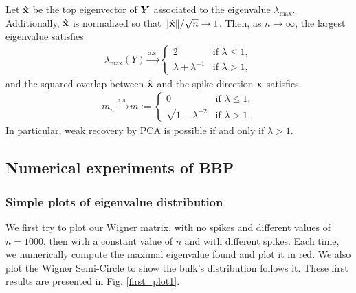 \documentclass[11pt]{article}
\begin{document}
\begin{theo}\label{thm:bbp}
Let $\hat{\boldsymbol{\mathbf{x}}}$ be the top eigenvector of $\bm{Y}$ associated to the eigenvalue $\lambda_{\max}$. Additionally, $\hat{\boldsymbol{\mathbf{x}}}$ is normalized so that $\|\hat{\boldsymbol{\mathbf{x}}}\|/\sqrt n\to1$. Then, as $n\to\infty$, the largest eigenvalue satisfies
\begin{align}
\lambda_{\max}(Y)\xrightarrow{\mathrm{a.s.}}
\begin{cases}
2 & \text{if } \lambda \le 1,\\[0.3em]
\lambda+\lambda^{-1} & \text{if } \lambda > 1,
\end{cases}
\end{align}
and the squared overlap between $\hat{\boldsymbol{\mathbf{x}}}$ and the spike direction $\boldsymbol{\mathbf{x}}$ satisfies
\begin{align}
    m_n
    \xrightarrow{\mathrm{a.s.}}
    m := \begin{cases}
        0 & \text{if } \lambda \le 1,\\[0.3em]
        \sqrt{1-\lambda^{-2}} & \text{if } \lambda > 1.
    \end{cases}
\end{align}
In particular, weak recovery by PCA is possible if and only if \(\lambda>1\).
\end{theo}




\subsection{Numerical experiments of BBP}

\subsubsection{Simple plots of eigenvalue distribution}
We first try to plot our Wigner matrix, with no spikes and different values of $n = 1000$, then with a constant value of $n$ and with different spikes. Each time, we numerically compute the maximal eigenvalue found and plot it in red. We also plot the Wigner Semi-Circle to show the bulk's distribution follows it. These first results are presented in Fig. \ref{first_plot1}.
\end{document}
